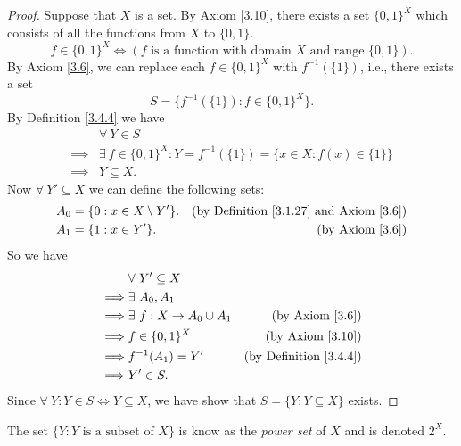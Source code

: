 \begin{proof}
    Suppose that \(X\) is a set.
    By Axiom \ref{3.10}, there exists a set \(\{0, 1\}^X\) which consists of all the functions from \(X\) to \(\{0, 1\}\).
    \[
        f \in \{0, 1\}^X \iff (f \text{ is a function with domain } X \text{ and range } \{0, 1\}).
    \]
    By Axiom \ref{3.6}, we can replace each \(f \in \{0, 1\}^X\) with \(f^{-1}(\{1\})\), i.e., there exists a set
    \[
        S = \{f^{-1}(\{1\}) : f \in \{0, 1\}^X\}.
    \]
    By Definition \ref{3.4.4} we have
    \begin{align*}
                 & \forall\ Y \in S                                                             \\
        \implies & \exists\ f \in \{0, 1\}^X : Y = f^{-1}(\{1\}) = \{x \in X : f(x) \in \{1\}\} \\
        \implies & Y \subseteq X.
    \end{align*}
    Now \(\forall\ Y' \subseteq X\) we can define the following sets:
    \begin{align*}
        A_0 & = \{0 : x \in X \setminus Y'\}. & \text{(by Definition \ref{3.1.27} and Axiom \ref{3.6})} \\
        A_1 & = \{1 : x \in Y'\}.             & \text{(by Axiom \ref{3.6})}
    \end{align*}
    So we have
    \begin{align*}
                 & \forall\ Y' \subseteq X                                              \\
        \implies & \exists\ A_0, A_1                                                    \\
        \implies & \exists\ f : X \to A_0 \cup A_1 & \text{(by Axiom \ref{3.6})}        \\
        \implies & f \in \{0, 1\}^X                & \text{(by Axiom \ref{3.10})}       \\
        \implies & f^{-1}(A_1) = Y'                & \text{(by Definition \ref{3.4.4})} \\
        \implies & Y' \in S.
    \end{align*}
    Since \(\forall\ Y : Y \in S \iff Y \subseteq X\), we have show that \(S = \{Y : Y \subseteq X\}\) exists.
\end{proof}

\begin{remark}\label{3.4.10}
    The set \(\{Y : Y \text{ is a subset of } X\}\) is know as the \emph{power set} of \(X\) and is denoted \(2^X\).
\end{remark}

